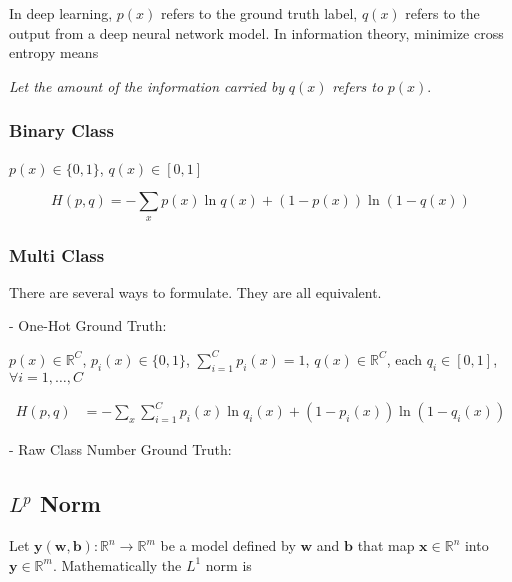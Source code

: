 \documentclass{article}
\begin{document}
            In deep learning, $ p(x) $ refers to the ground truth label, $ q(x) $
            refers to the output from a deep neural network model. In information theory,
            minimize cross entropy means

            \textit{Let the amount of the information carried by} $ q(x) $ \textit{refers to} $ p(x) $.
            
            \subsubsection{Binary Class}
                $ p(x) \in \{0, 1\} $, $ q(x) \in [0, 1] $

                 \begin{equation*}
                      H(p, q) = -\sum_{x} p(x) \ln q(x) + ( 1 - p(x) ) \ln ( 1 - q(x) )
                 \end{equation*}

            \subsubsection{Multi Class}

                There are several ways to formulate. They are all equivalent.

                - One-Hot Ground Truth:

                $ p(x) \in \mathbb{R}^C $, $ p_{i}(x) \in \{0, 1\} $, $ \sum_{i=1}^C p_{i}(x) = 1 $, $ q(x)
                \in \mathbb{R}^C $, each $ q_{i} \in [0, 1] $, $ \forall i=1, \dots, C $

                 \begin{align*}
                      H(p, q) &= -\sum_{x} \sum_{i=1}^C p_{i}(x)\ln q_{i}(x) + ( 1 - p_{i}(x)) \ln ( 1 - q_{i}(x) )
                 \end{align*}

                - Raw Class Number Ground Truth:



        \subsection{\texorpdfstring{$L^p$}{Lp} Norm}

            Let $\boldsymbol{y}(\boldsymbol{w},\boldsymbol{b}): \mathbb{R}^n
            \rightarrow \mathbb{R}^m$ be a model defined by $\boldsymbol{w}$
            and $\boldsymbol{b}$ that map $\boldsymbol{x} \in \mathbb{R}^n$
            into $\boldsymbol{y} \in \mathbb{R}^m$. Mathematically the $L^1$
            norm is
\end{document}
